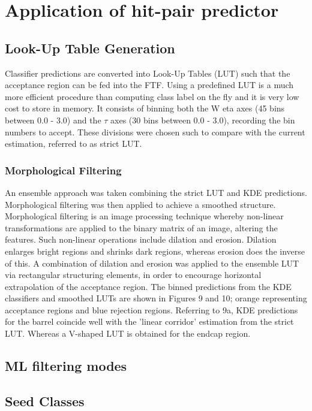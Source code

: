 \section{Application of hit-pair predictor}
\label{application-of-hit-pair-predictor}

\subsection{Look-Up Table Generation}

Classifier predictions are converted into Look-Up Tables (LUT) such that the acceptance region can be fed into the FTF. Using a predefined LUT is a much more efficient procedure than computing class label on the fly and it is very low cost to store in memory. It consists of binning both the W eta axes (45 bins between 0.0 - 3.0) and the $\tau$ axes (30 bins between 0.0 - 3.0), recording the bin numbers to accept. These divisions were chosen such to compare with the current estimation, referred to as strict LUT.

\subsubsection{Morphological Filtering}

An ensemble approach was taken combining the strict LUT and KDE predictions. Morphological filtering was then applied to achieve a smoothed structure. Morphological filtering is an image processing technique whereby non-linear transformations are applied to the binary matrix of an image, altering the features. Such non-linear operations include dilation and erosion. Dilation enlarges bright regions and shrinks dark regions, whereas erosion does the inverse of this. A combination of dilation and erosion was applied to the ensemble LUT via rectangular structuring elements, in order to encourage horizontal
extrapolation of the acceptance region. The binned predictions from the KDE classifiers and smoothed LUTs are shown in Figures 9 and 10; orange representing acceptance regions and blue rejection regions.
Referring to 9a, KDE predictions for the barrel coincide well with the ’linear corridor’ estimation from the strict LUT. Whereas a V-shaped LUT is obtained for the endcap region.


\subsection{ML filtering modes}

\subsection{Seed Classes}



